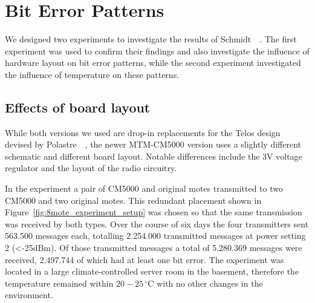 \section{Bit Error Patterns}

We designed two experiments to investigate the results of Schmidt~\etal~\cite{Schmidt2013}.
The first experiment was used to confirm their findings and also investigate the influence of hardware layout on bit error patterns, while the second experiment investigated the influence of temperature on these patterns.

\subsection{Effects of board layout}
\label{subsec:effects_of_board_layout}

While both versions we used are drop-in replacements for the Telos design devised by Polastre~\etal~\cite{Polastre2005}, the newer MTM-CM5000 version uses a slightly different schematic and different board layout.
Notable differences include the 3V voltage regulator and the layout of the radio circuitry.

In the experiment a pair of CM5000 and original motes transmitted to two CM5000 and two original motes.
This redundant placement shown in Figure~\ref{fig:8mote_experiment_setup} was chosen so that the same transmission was received by both types.
Over the course of six days the four transmitters sent 563.500 messages each, totalling 2.254.000 transmitted messages at power setting 2 (<-25dBm). Of those transmitted messages a total of 5.280.369 messages were received, 2.497.744 of which had at least one bit error.
The experiment was located in a large climate-controlled server room in the basement, therefore the temperature remained within $20-25\,^{\circ}\mathrm{C}$ with no other changes in the environment.

